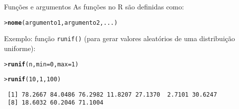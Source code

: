 \documentclass[10pt,handout]{beamer}\usepackage{graphicx, color}
\makeatletter
\newcommand{\hlfunctioncall}[1]{\textcolor[rgb]{0,0,0.545098039215686}{\textbf{#1}}}%
\newenvironment{kframe}{%
 \def\at@end@of@kframe{}%
 \ifinner\ifhmode%
  \def\at@end@of@kframe{\end{minipage}}%
  \begin{minipage}{\columnwidth}%
 \fi\fi%
 \def\FrameCommand##1{\hskip\@totalleftmargin \hskip-\fboxsep
 \colorbox{shadecolor}{##1}\hskip-\fboxsep
     \hskip-\linewidth \hskip-\@totalleftmargin \hskip\columnwidth}%
 \MakeFramed {\advance\hsize-\width
   \@totalleftmargin\z@ \linewidth\hsize
   \@setminipage}}%
 {\par\unskip\endMakeFramed%
 \at@end@of@kframe}
\newenvironment{knitrout}{}{} %
\makeatother
\begin{document}
\begin{frame}[fragile=singleslide]{Funções e argumentos}
As funções no R são definidas como:
\begin{knitrout}\small
{}\color{fgcolor}\begin{kframe}
\begin{alltt}
> \hlfunctioncall{nome}(argumento1, argumento2, ...)
\end{alltt}
\end{kframe}
\end{knitrout}

Exemplo: função \verb|runif()| (para gerar valores aleatórios de uma
distribuição uniforme):
\begin{knitrout}\small
{}\color{fgcolor}\begin{kframe}
\begin{alltt}
> \hlfunctioncall{runif}(n, min = 0, max = 1)
\end{alltt}
\end{kframe}
\end{knitrout}

\begin{knitrout}\small
{}\color{fgcolor}\begin{kframe}
\begin{alltt}
> \hlfunctioncall{runif}(10, 1, 100)
\end{alltt}
\begin{verbatim}
 [1] 78.2667 84.0486 76.2982 11.8207 27.1370  2.7101 30.6247
 [8] 18.6032 60.2046 71.1004
\end{verbatim}
\end{kframe}
\end{knitrout}

\end{frame}
\end{document}
